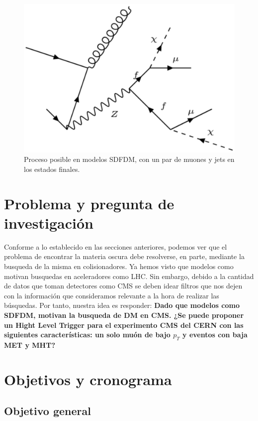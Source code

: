 \begin{figure}
 	\centering
 	\includegraphics[width=13cm]{F6.png}
 	\caption{\label{fig:frog} Proceso posible en modelos SDFDM, con un par de muones y jets en los estados finales.}
\end{figure}

\newpage
\section{Problema y pregunta de investigación}

	Conforme a lo establecido en las secciones anteriores, podemos ver que el problema de encontrar la materia oscura debe resolverse, en parte, mediante la busqueda de la misma en colisionadores. Ya hemos visto que modelos como \cite{1475-7516-2016-03-048} motivan busquedas en aceleradores como LHC. Sin embargo, debido a la cantidad de datos que toman detectores como CMS se deben idear filtros que nos dejen con la información que consideramos relevante a la hora de realizar las búsquedas. Por tanto, nuestra idea es responder: \textbf{Dado que modelos como SDFDM, motivan la busqueda de DM en CMS. ¿Se puede proponer un Hight Level Trigger para el experimento CMS del CERN con las siguientes características: un solo muón de bajo $p_T$ y eventos con baja MET y MHT?}


\newpage
\section{Objetivos y cronograma}


\subsection{Objetivo general}

